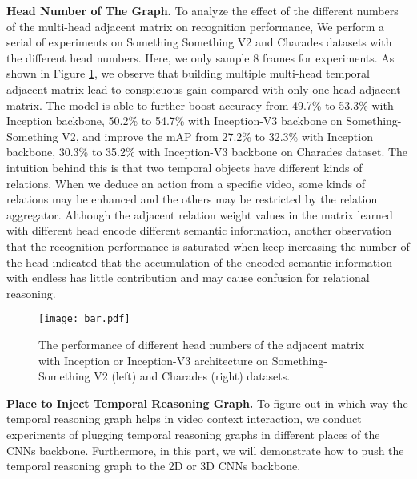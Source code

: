 \documentclass[conference,compsoc]{IEEEtran}
\begin{document}
    \noindent\textbf{Head Number of The Graph.} To analyze the effect of the different numbers of the multi-head adjacent matrix on recognition performance, We perform a serial of experiments on Something Something V2 and Charades datasets with the different head numbers. Here, we only sample 8 frames for experiments. As shown in Figure \ref{fig:head}, we observe that building multiple multi-head temporal adjacent matrix lead to conspicuous gain compared with only one head adjacent matrix. The model is able to further boost accuracy from 49.7\% to 53.3\% with Inception backbone, 50.2\% to 54.7\% with Inception-V3 backbone on Something-Something V2, and improve the mAP from 27.2\% to 32.3\% with Inception backbone, 30.3\% to 35.2\% with Inception-V3 backbone on Charades dataset. The intuition behind this is that two temporal objects have different kinds of relations. When we deduce an action from a specific video, some kinds of relations may be enhanced and the others may be restricted by the relation aggregator. Although the adjacent relation weight values in the matrix learned with different head encode different semantic information, another observation that the recognition performance is saturated when keep increasing the number of the head indicated that the accumulation of the encoded semantic information with endless has little contribution and may cause confusion for relational reasoning.
    
    \begin{figure}[h]
    \centering
    \texttt{[image: bar.pdf]}
    \caption{The performance of different head numbers of the adjacent matrix with Inception or Inception-V3 architecture on Something-Something V2 (left) and Charades (right) datasets.}
    \label{fig:head}
    \end{figure}
    

\noindent\textbf{Place to Inject Temporal Reasoning Graph.} To figure out in which way the temporal reasoning graph helps in video context interaction, we conduct experiments of plugging temporal reasoning graphs in different places of the CNNs backbone. Furthermore, in this part, we will demonstrate how to push the temporal reasoning graph to the 2D or 3D CNNs backbone.
    
\end{document}
